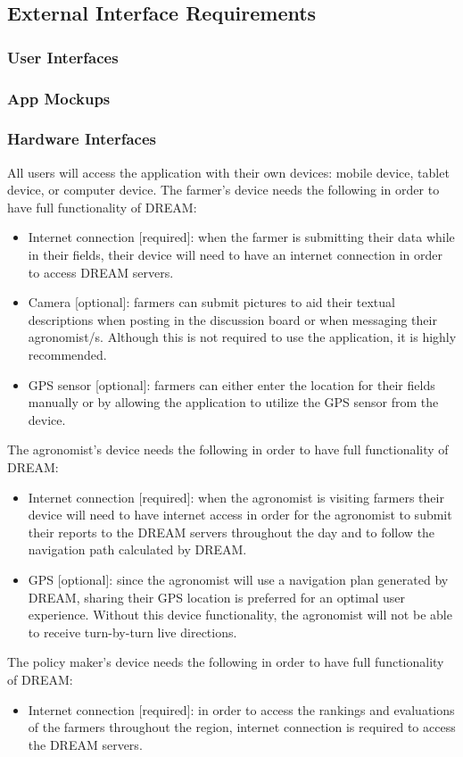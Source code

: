 \subsection{External Interface Requirements}

\subsubsection{User Interfaces}
\subsubsection{App Mockups}

\subsubsection{Hardware Interfaces}
\begin{flushleft}
All users will access the application with their own devices: mobile device, tablet device, or computer device.
The farmer's device needs the following in order to have full functionality of DREAM:
\begin{itemize}
\item Internet connection [required]: when the farmer is submitting their data while in their fields, their device will need to have an internet connection in order to access DREAM servers.
\item Camera [optional]: farmers can submit pictures to aid their textual descriptions when posting in the discussion board or when messaging their agronomist/s. Although this is not required to use the application, it is highly recommended.
\item GPS sensor [optional]: farmers can either enter the location for their fields manually or by allowing the application to utilize the GPS sensor from the device.
\end{itemize}

The agronomist's device needs the following in order to have full functionality of DREAM:
\begin{itemize}
\item Internet connection [required]: when the agronomist is visiting farmers their device will need to have internet access in order for the agronomist to submit their reports to the DREAM servers throughout the day and to follow the navigation path calculated by DREAM.
\item GPS [optional]: since the agronomist will use a navigation plan generated by DREAM, sharing their GPS location is preferred for an optimal user experience. Without this device functionality, the agronomist will not be able to receive turn-by-turn live directions.
\end{itemize}

The policy maker's device needs the following in order to have full functionality of DREAM:
\begin{itemize}
\item Internet connection [required]: in order to access the rankings and evaluations of the farmers throughout the region, internet connection is required to access the DREAM servers.
\end{itemize}
\end{flushleft}

